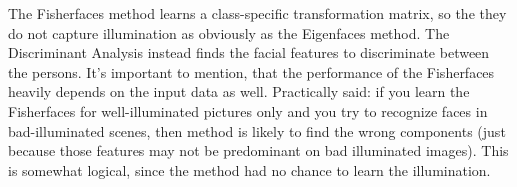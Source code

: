 \ifx\python\undefined
	
\else
	
\fi

The Fisherfaces method learns a class-specific transformation matrix, so the they do not capture illumination as obviously as the Eigenfaces method. The Discriminant Analysis instead finds the facial features to discriminate between the persons. It's important to mention, that the performance of the Fisherfaces heavily depends on the input data as well. Practically said: if you learn the Fisherfaces for well-illuminated pictures only and you try to recognize faces in bad-illuminated scenes, then method is likely to find the wrong components (just because those features may not be predominant on bad illuminated images). This is somewhat logical, since the method had no chance to learn the illumination.

